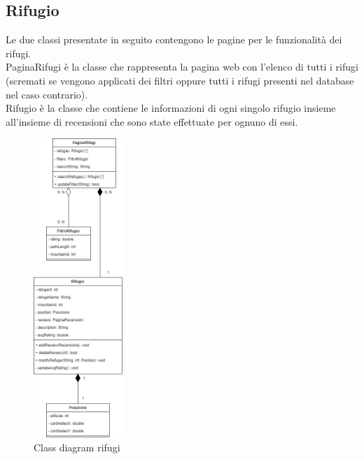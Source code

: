 \documentclass[a4paper,12pt]{article}
\begin{document}
\subsection{Rifugio}
Le due classi presentate in seguito contengono le pagine per le funzionalità dei rifugi.\\
PaginaRifugi è la classe che rappresenta la pagina web con l'elenco di tutti i rifugi (scremati se vengono applicati dei filtri oppure tutti i rifugi presenti nel database nel caso contrario).\\
Rifugio  è la classe che contiene le informazioni di ogni singolo rifugio insieme all'insieme di recensioni che sono state effettuate per ognuno di essi.\\
\begin{figure}[H]
   \centering
   \includegraphics[width=0.30\textwidth] {D3/img/class_diagram_refuges.png}
    \caption{Class diagram rifugi}
\end{figure}
\end{document}
